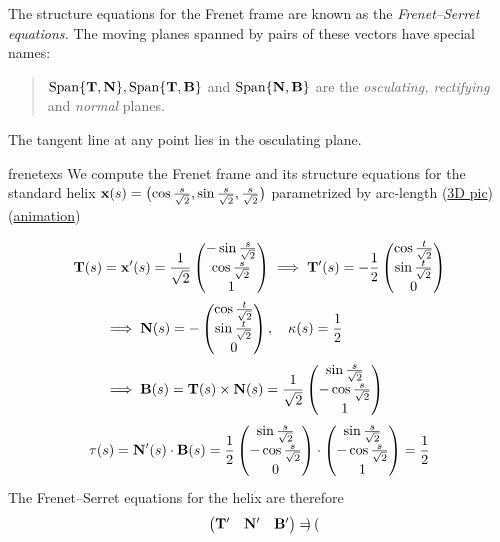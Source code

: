 
The structure equations for the Frenet frame are known as the \emph{Frenet--Serret equations.} The moving planes spanned by pairs of these vectors have special names:
\begin{quote}
	$\operatorname{Span}\{{\mathbf{T}},{\mathbf{N}}\},\operatorname{Span}\{{\mathbf{T}},{\mathbf{B}}\}$ and $\operatorname{Span}\{{\mathbf{N}},{\mathbf{B}}\}$ are the \emph{osculating, rectifying} and \emph{normal} planes.
\end{quote}
The tangent line at any point lies in the osculating plane. %

\vfil\vfil
\goodbreak
	
\begin{examples}{}{frenetexs}
\exstart We compute the Frenet frame and its structure equations for the standard helix ${\mathbf{x}}(s)=\bigl(\cos\frac s{\sqrt 2},\sin\frac s{\sqrt 2},\frac s{\sqrt 2}\bigr)$ parametrized by arc-length (\href{http://www.math.uci.edu/~ndonalds/math162a/frenet-helixstill.html}{3D pic})(\href{http://www.math.uci.edu/~ndonalds/math162a/frenet-helixanim.html}{animation})\par
\begin{enumerate}\setcounter{enumi}{1}
\begin{minipage}[t]{0.71\linewidth}\vspace{-8pt}
\item[]\begin{gather*}
\begin{aligned}
{\mathbf{T}}(s)&={\mathbf{x}}'(s)=\frac 1{\sqrt 2}\begin{pmatrix}-\sin\frac s{\sqrt 2}\\\cos\frac s{\sqrt 2}\\1\end{pmatrix}\implies {\mathbf{T}}'(s)=-\frac 12\begin{pmatrix}\cos\frac t{\sqrt 2}\\\sin\frac t{\sqrt 2}\\0\end{pmatrix}\\
&\implies {\mathbf{N}}(s)=-\begin{pmatrix}\cos\frac t{\sqrt 2}\\\sin\frac t{\sqrt 2}\\0\end{pmatrix},\quad\kappa(s)=\frac 12\\
&\implies {\mathbf{B}}(s)={\mathbf{T}}(s)\times{\mathbf{N}}(s)=\frac 1{\sqrt 2}\begin{pmatrix}\sin\frac s{\sqrt 2}\\-\cos\frac s{\sqrt 2}\\1\end{pmatrix}
\end{aligned}\\
\tau(s)={\mathbf{N}}'(s)\cdot{\mathbf{B}}(s)=\frac 1{2}\begin{pmatrix}\sin\frac s{\sqrt 2}\\-\cos\frac s{\sqrt 2}\\0\end{pmatrix}\cdot\begin{pmatrix}\sin\frac s{\sqrt 2}\\-\cos\frac s{\sqrt 2}\\1\end{pmatrix}=\frac 12
\end{gather*}
The Frenet--Serret equations for the helix are therefore
\[\begin{pmatrix}
  {\mathbf{T}}'&{\mathbf{N}}'&{\mathbf{B}}'
  \end{pmatrix}=\begin{pmatrix}

\end{pmatrix}\]
\end{minipage}
\end{enumerate}
\end{examples}
